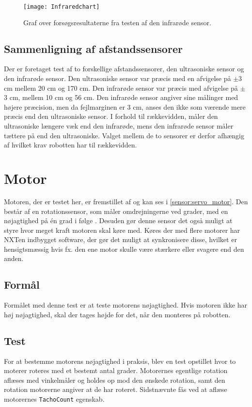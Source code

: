 \begin{figure}[h]
\texttt{[image: Infraredchart]}
\caption{Graf over forsøgsresultaterne fra testen af den infrarøde sensor.}
\label{sensor:infrared_chart}
\end{figure}

\subsection{Sammenligning af afstandssensorer}

Der er foretaget test af to forskellige afstandssensorer, den ultrasoniske sensor og den infrarøde sensor. 
Den ultrasoniske sensor var præcis med en afvigelse på $\pm$3 cm mellem 20 cm og 170 cm.
Den infrarøde sensor var præcis med afvigelse på $\pm$3 cm, mellem 10 cm og 56 cm.
Den infrarøde sensor angiver sine målinger med højere præcision, men da fejlmarginen er 3 cm, anses den ikke som værende mere præcis end den ultrasoniske sensor.
I forhold til rækkevidden, måler den ultrasoniske længere væk end den infrarøde, mens den infrarøde sensor måler tættere på end den ultrasoniske.
Valget mellem de to sensorer er derfor afhængig af hvilket krav robotten har til rækkevidden.

\section{Motor}\label{sensorer:motorer}
Motoren, der er testet her, er fremstillet af \lego og kan ses i \cref{sensor:servo_motor}.
Den består af en rotationssensor, som måler omdrejningerne ved grader, med en nøjagtighed på \'en grad i følge \lego. 
Desuden gør denne sensor det også muligt at styre hvor meget kraft motoren skal køre med.
Køres der med flere motorer har NXTen indbygget software, der gør det muligt at synkronisere disse, hvilket er hensigtsmæssig hvis fx. den ene motor skulle være stærkere eller svagere end den anden.\cite{tikNXT}

\subsection{Formål}
Formålet med denne test er at teste motorens nøjagtighed.
Hvis motoren ikke har høj nøjagtighed, skal der tages højde for det, når den monteres på robotten.

\subsection{Test}
For at bestemme motorens nøjagtighed i praksis, blev en test opstillet hvor to moterer roteres med et bestemt antal grader.
Motorernes egentlige rotation aflæses med vinkelmåler og holdes op mod den ønskede rotation, samt den rotation motorerne angiver at de har roteret.
Sidstnævnte fås ved at aflæse motorernes \lstinline[style=csharp]!TachoCount! egenskab.

